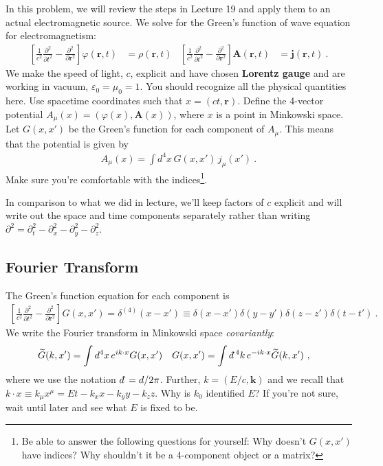 \documentclass[12pt]{article}
\numberwithin{equation}{section}    %
\renewcommand{\tilde}{\widetilde}   %
\renewcommand{\vec}[1]{\mathbf{#1}} %
\newcommand{\dbar}{d\mkern-6mu\mathchar'26}    %
\begin{document}
In this problem, we will review the steps in Lecture 19 and apply them to an actual electromagnetic source. 
%
We solve for the Green's function of wave equation for electromagnetism: 
\begin{align}
	\left[\frac{1}{c^2}\frac{\partial^2}{\partial t^2} - \frac{\partial^2}{\partial \vec{r}^2}\right] 
	\varphi(\vec{r},t) &= \rho(\vec{r},t)
	&
	\left[\frac{1}{c^2}\frac{\partial^2}{\partial t^2} - \frac{\partial^2}{\partial \vec{r}^2}\right]
	\vec A(\vec{r},t) &= \vec j(\vec{r},t) \ .
	\label{eq:EM:wave}
\end{align}
We make the speed of light, $c$, explicit and have chosen \textbf{Lorentz gauge} and are working in vacuum, $\varepsilon_0 = \mu_0 = 1$. 
%
You should recognize all the physical quantities here. 
% 
Use spacetime coordinates such that $x = (ct,\vec r)$. Define the 4-vector potential $A_\mu(x) = \left(\varphi(x),\vec A(x)\right)$, where $x$ is a point in Minkowski space. Let $G(x,x')$ be the Green's function for each component of $A_\mu$. 
%
This means that the potential is given by
\begin{align}
	A_\mu(x) = \int d^4x \, G(x,x') \, j_\mu(x') \ .
\end{align}
Make sure you're comfortable with the indices\footnote{Be able to answer the following questions for yourself: Why doesn't $G(x,x')$ have indices? Why shouldn't it be a 4-component object or a matrix?}. 

In comparison to what we did in lecture, we'll keep factors of $c$ explicit and will write out the space and time components separately rather than writing $\partial^2 = \partial_t^2 -\partial_x^2 -\partial_y^2 -\partial_z^2$.




\subsection{Fourier Transform}

The Green's function equation for each component is
\begin{align}
	\left[\frac{1}{c^2}\frac{\partial^2}{\partial t^2} - \frac{\partial^2}{\partial \vec{r}^2}\right] G(x,x') = \delta^{(4)}(x-x') \equiv \delta(x-x')\delta(y-y')\delta(z-z')\delta(t-t') \ .
	\label{eq:4D:define:G}
\end{align}
We write the Fourier transform in Minkowski space \emph{covariantly}:
\begin{align}
	\tilde G(k,x') &= \int d^4x \, e^{ik\cdot x} G(x,x')
	&
	G(x,x') &= \int \dbar^4k \, e^{-ik\cdot x} \tilde G(k,x') \ ,
\end{align}
where we use the notation $\dbar = d/2\pi$. Further, $k = (E/c,\vec k)$ and we recall that $k\cdot x \equiv k_\mu x^\mu = Et - k_x x - k_y y - k_z z$. Why is $k_0$ identified $E$? If you're not sure, wait until later and see what $E$ is fixed to be.
\end{document}
